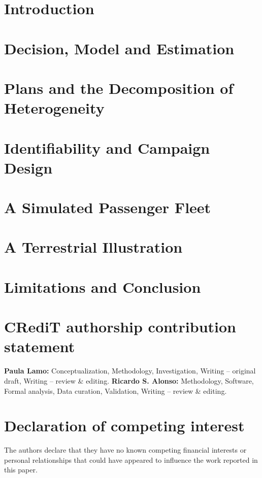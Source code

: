 \documentclass[preprint,12pt]{elsarticle}
\begin{document}
\linenumbers

\section{Introduction}
\label{sec:intro}


\section{Decision, Model and Estimation}
\label{sec:model}


\section{Plans and the Decomposition of Heterogeneity}
\label{sec:plans}


\section{Identifiability and Campaign Design}
\label{sec:design}


\section{A Simulated Passenger Fleet}
\label{sec:fleet}


\section{A Terrestrial Illustration}
\label{sec:lighting}


\section{Limitations and Conclusion}
\label{sec:conclusion}


\section*{CRediT authorship contribution statement}
\textbf{Paula Lamo:} Conceptualization, Methodology, Investigation,
Writing -- original draft, Writing -- review \& editing.
\textbf{Ricardo S. Alonso:} Methodology, Software, Formal analysis, Data
curation, Validation, Writing -- review \& editing.

\section*{Declaration of competing interest}
The authors declare that they have no known competing financial interests or
personal relationships that could have appeared to influence the work reported
in this paper.
\end{document}
